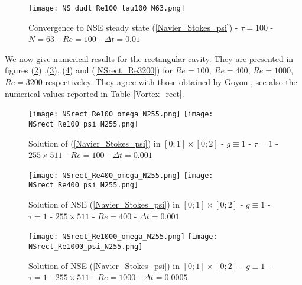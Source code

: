{\begin{figure}[!ht]
\begin{center}
\texttt{[image: NS\_dudt\_Re100\_tau100\_N63.png]}
\caption{Convergence to NSE steady state (\ref{Navier_Stokes_psi}) - $\tau = 100$ -  $N=63$ - $Re = 100$ - $\Delta t = 0.01$}
\label{NS_dudt_Re100_tau100_N63}
\end{center}
\end{figure}



We now give numerical results for the rectangular cavity. They are presented in figures  (\ref{NSrect_Re100}) ,(\ref{NSrect_Re400}), (\ref{NSrect_Re1000}) and (\ref{NSrect_Re3200}) for $Re=100, \ Re=400$, $Re=1000$, $Re=3200$ respectiveley. They agree with those obtained by Goyon \cite{Goyon}, see also the numerical values reported in Table \ref{Vortex_rect}.

\begin{figure}[!ht]
\begin{center}
\texttt{[image: NSrect\_Re100\_omega\_N255.png]}
\texttt{[image: NSrect\_Re100\_psi\_N255.png]}\\
\caption{Solution of (\ref{Navier_Stokes_psi}) in $[0; 1] \times [0; 2]$ - $g \equiv 1$ - $\tau = 1$ -  $255 \times 511$ - $Re = 100$ - $\Delta t = 0.001$}
\label{NSrect_Re100}
\end{center}
\end{figure}

\begin{figure}[!ht]
\begin{center}
\texttt{[image: NSrect\_Re400\_omega\_N255.png]}
\texttt{[image: NSrect\_Re400\_psi\_N255.png]}\\
\caption{Solution of NSE (\ref{Navier_Stokes_psi}) in $[0; 1] \times [0; 2]$ - $g \equiv 1$ - $\tau = 1$ -  $255 \times 511$ - $Re = 400$ - $\Delta t = 0.001$}
\label{NSrect_Re400}
\end{center}
\end{figure}

\begin{figure}[!ht]
\begin{center}
\texttt{[image: NSrect\_Re1000\_omega\_N255.png]}
\texttt{[image: NSrect\_Re1000\_psi\_N255.png]}\\
\caption{Solution of NSE (\ref{Navier_Stokes_psi}) in $[0; 1] \times [0; 2]$ - $g \equiv 1$ - $\tau = 1$ -  $255 \times 511$ - $Re = 1000$ - $\Delta t = 0.0005$}
\label{NSrect_Re1000}
\end{center}
\end{figure}




}
